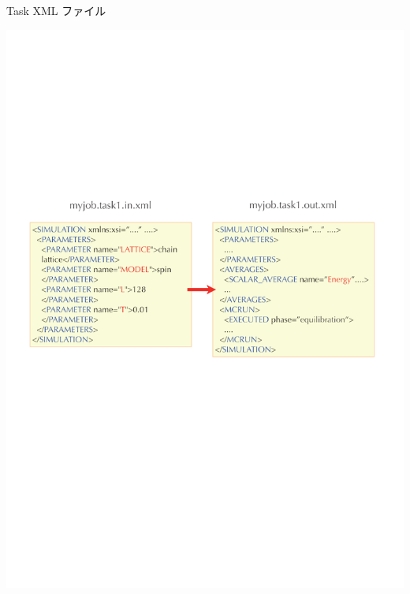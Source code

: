 \begin{frame}{Task XML ファイル}
  \begin{center}
    \includegraphics[height=.6\textheight]{simulation3.pdf}
  \end{center}
\end{frame}


